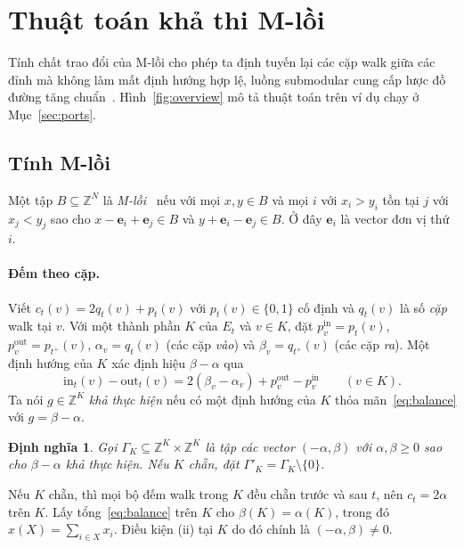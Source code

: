 \documentclass[pdflatex,sn-mathphys-num]{sn-jnl}
\theoremstyle{thmstyleone}
\theoremstyle{thmstyletwo}
\theoremstyle{thmstylethree}
\newtheorem{definition}{Định nghĩa}
\newcommand{\Z}{\mathbb{Z}}
\newcommand{\e}{\mathbf{e}}
\newcommand{\out}{\mathrm{out}}
\newcommand{\inn}{\mathrm{in}}
\begin{document}
\section{Thuật toán khả thi M-lồi}\label{sec:mconvex}

Tính chất trao đổi của M-lồi cho phép ta định tuyến lại các cặp walk giữa các đỉnh mà không làm mất định hướng hợp lệ, luồng submodular cung cấp lược đồ đường tăng chuẩn~\cite{cunningham1985,fujishige2005}. Hình~\ref{fig:overview} mô tả thuật toán trên ví dụ chạy ở Mục~\ref{sec:ports}.



\subsection{Tính M-lồi}\label{sec:mcsets}

Một tập $B\subseteq\Z^N$ là \emph{M-lồi}~\cite{murota1996,murota2003} nếu với mọi $x,y\in B$ và mọi $i$ với $x_i>y_i$ tồn tại $j$ với $x_j<y_j$ sao cho $x-\e_i+\e_j\in B$ và $y+\e_i-\e_j\in B$. Ở đây $\e_i$ là vector đơn vị thứ $i$.

\paragraph{Đếm theo cặp.}

Viết $c_t(v)=2q_t(v)+p_t(v)$ với $p_t(v)\in\{0,1\}$ cố định và $q_t(v)$ là số \emph{cặp} walk tại $v$. Với một thành phần $K$ của $E_t$ và $v\in K$, đặt $p^{\inn}_v=p_t(v)$, $p^{\out}_v=p_{t^+}(v)$, $\alpha_v=q_t(v)$ (các cặp \emph{vào}) và $\beta_v=q_{t^+}(v)$ (các cặp \emph{ra}). Một định hướng của $K$ xác định hiệu $\beta-\alpha$ qua
\begin{equation}\label{eq:balance}
  \inn_t(v)-\out_t(v)=2(\beta_v-\alpha_v)+p^{\out}_v-p^{\inn}_v\qquad (v\in K).
\end{equation}
Ta nói $g\in\Z^K$ \emph{khả thực hiện} nếu có một định hướng của $K$ thỏa mãn~\eqref{eq:balance} với $g=\beta-\alpha$.

\begin{definition}\label{def:gamma}
Gọi $\Gamma_K\subseteq\Z^{K}\times\Z^{K}$ là tập các vector $(-\alpha,\beta)$ với $\alpha,\beta\ge0$ sao cho $\beta-\alpha$ khả thực hiện. Nếu $K$ chẵn, đặt $\Gamma'_K=\Gamma_K\setminus\{0\}$.
\end{definition}

Nếu $K$ chẵn, thì mọi bộ đếm walk trong $K$ đều chẵn trước và sau $t$, nên $c_t=2\alpha$ trên $K$. Lấy tổng~\eqref{eq:balance} trên $K$ cho $\beta(K)=\alpha(K)$, trong đó $x(X)=\sum_{i\in X}x_i$. Điều kiện (ii) tại $K$ do đó chính là $(-\alpha,\beta)\ne0$.
\end{document}
